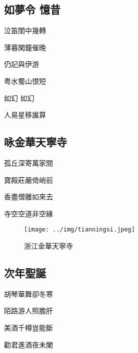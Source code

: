 \documentclass[a4j,12pt]{ltjtarticle}
\begin{document}
\begin{center}
	\begin{flushleft}
		\section{如夢令 憶昔} 
	\end{flushleft}	
	
	\vfill
	\LARGE 泣笛閨中幾轉\par
	薄暮閑鐘催晚\par
	仍記與伊游\par 
	粤水蜀山恨短 \par
	如幻    如幻\par
	人易星移誰算\par
	\vspace{1.5cm} %
	\vfill
	
	
	\newpage

	\begin{flushleft}
		\section{咏金華天寧寺}
	\end{flushleft}

	\vfill
		\LARGE 孤丘深寄萬家間\par
		寶殿莊嚴倚峭前\par
		香盡僧離如來去\par
		寺空空道非空緣\par
		\vspace{1.5cm} %
	\vfill

	
	\newpage
	\vfill
	\begin{figure}[h!]
		\centering
		\texttt{[image: ../img/tianningsi.jpeg]}
		\caption{浙江金華天寧寺}
		\label{fig:tianningsi}
	\end{figure}
	\vfill


	\begin{flushleft}
		\section{次年聖誕}
	\end{flushleft}

	\vfill
		\LARGE 胡琴華舞卻冬寒\par
		陌路游人照膽肝\par
		美酒千樽豈能斷\par
		勸君進酒夜未闌\par
		\vspace{1.5cm} %
	\vfill


\end{center}
\end{document}
